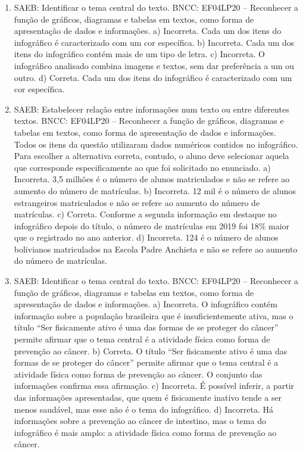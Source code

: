 \begin{enumerate}
\item
SAEB: Identificar o tema central do texto.
BNCC: EF04LP20 -- Reconhecer a função de gráficos, diagramas e tabelas em
textos, como forma de apresentação de dados e informações.
a) Incorreta. Cada um dos itens do infográfico é caracterizado com um cor
específica. 
b) Incorreta. Cada um dos itens do infográfico contém mais de um tipo de
letra.
c) Incorreta. O infográfico analisado combina imagens e textos, sem dar
preferência a um ou outro.
d) Correta. Cada um dos itens do infográfico é caracterizado com um cor
específica.

\item
SAEB: Estabelecer relação entre informações num texto ou entre
diferentes textos.
BNCC: EF04LP20 -- Reconhecer a função de gráficos, diagramas e tabelas em
textos, como forma de apresentação de dados e informações.
Todos os itens da questão utilizaram dados numéricos contidos no 
infográfico. Para escolher a alternativa correta, contudo, o aluno 
deve selecionar aquela que corresponde especificamente ao que foi
solicitado no enunciado. 
a) Incorreta. 3,5 milhões é o número de alunos matriculados e não se 
refere ao aumento do número de matrículas.
b) Incorreta. 12 mil é o número de alunos estrangeiros matriculados
e não se refere ao aumento do número de matrículas.
c) Correta. Conforme a segunda informação em destaque no infográfico
depois do título, o número de matrículas em 2019 foi 18\% maior que o
registrado no ano anterior. 
d)  Incorreta. 124 é o número de alunos bolivianos matriculados na 
Escola Padre Anchieta e não se refere ao aumento do número de matrículas.

\item
SAEB: Identificar o tema central do texto.
BNCC: EF04LP20 -- Reconhecer a função de gráficos, diagramas e tabelas em
textos, como forma de apresentação de dados e informações.
a)  Incorreta. O infográfico contém informação sobre a população 
brasileira que é insuficientemente ativa, mas o título ``Ser fisicamente
ativo é uma das formas de se proteger do câncer'' permite afirmar que o 
tema central é a atividade física como forma de prevenção ao câncer. 
b)  Correta. O título ``Ser fisicamente ativo é uma das formas de se
proteger do câncer'' permite afirmar que o tema central é a atividade 
física como forma de prevenção ao câncer. O conjunto das informações 
confirma essa afirmação.  
c)  Incorreta. É possível inferir, a partir das informações apresentadas,
que quem é fisicamente inativo tende a ser menos saudável, mas esse não é
o tema do infográfico. 
d)  Incorreta. Há informações sobre a prevenção ao câncer de intestino,
mas o tema do infográfico é mais amplo: a atividade física como forma de
prevenção ao câncer.
\end{enumerate}


